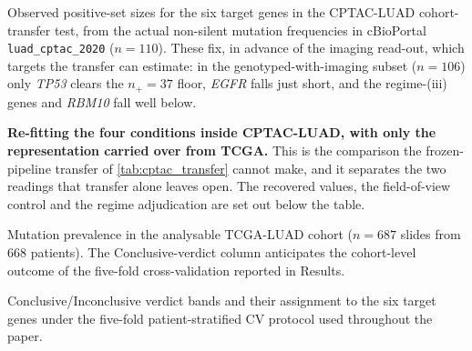 
\begin{table}[htbp]
\centering

\caption{Observed positive-set sizes for the six target genes in the
CPTAC-LUAD cohort-transfer test, from the actual non-silent mutation
frequencies in cBioPortal \texttt{luad\_cptac\_2020} ($n\!=\!110$). These
fix, in advance of the imaging read-out, which targets the transfer can
estimate: in the genotyped-with-imaging subset ($n\!=\!106$) only
\textit{TP53} clears the $n_+\!=\!37$ floor, \textit{EGFR} falls just
short, and the regime-(iii) genes and \textit{RBM10} fall well below.}
\label{tab:cptac_power}
\end{table}

\begin{table}[htbp]
\centering

\caption{\textbf{Re-fitting the four conditions inside CPTAC-LUAD, with
only the representation carried over from TCGA.} This is the comparison
the frozen-pipeline transfer of \cref{tab:cptac_transfer} cannot make,
and it separates the two readings that transfer alone leaves open. The
recovered values, the field-of-view control and the regime adjudication
are set out below the table.}
\label{tab:cptac_refit}
\end{table}

\begin{table}[htbp]
\centering

\caption{Mutation prevalence in the analysable TCGA-LUAD cohort
($n\!=\!687$ slides from $668$ patients).
The Conclusive-verdict column anticipates the cohort-level outcome
of the five-fold cross-validation reported in Results.}
\label{tab:mutation_prevalence}
\end{table}

\begin{table}[htbp]
\centering

\caption{Conclusive/Inconclusive verdict bands and their assignment
to the six target genes under the five-fold patient-stratified CV
protocol used throughout the paper.}
\label{tab:viz_folds_methods}
\end{table}
